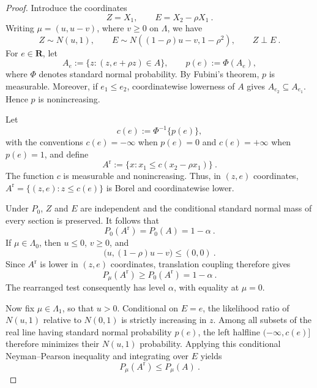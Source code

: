 \documentclass[12pt]{article}
\theoremstyle{remark}
\begin{document}
\begin{proof}
Introduce the coordinates
\[
Z=X_1,
\qquad
E=X_2-\rho X_1~.
\]
Writing $\mu=(u,u-v)$, where $v\ge0$ on $\Lambda$, we have
\[
Z\sim N(u,1),
\qquad
E\sim N((1-\rho)u-v,1-\rho^2),
\qquad
Z\perp E~.
\]
For $e\in\mathbf R$, let
\[
A_e:=\{z:(z,e+\rho z)\in A\},
\qquad
p(e):=\Phi(A_e),
\]
where $\Phi$ denotes standard normal probability.  By Fubini's theorem,
$p$ is measurable.  Moreover, if $e_1\le e_2$, coordinatewise lowerness of
$A$ gives $A_{e_2}\subseteq A_{e_1}$.  Hence $p$ is nonincreasing.

Let
\[
c(e):=\Phi^{-1}\{p(e)\},
\]
with the conventions $c(e)=-\infty$ when $p(e)=0$ and $c(e)=+\infty$ when
$p(e)=1$, and define
\begin{equation}\label{eq:rearranged-set}
A^{\mathrm r}
:=\{x:x_1\le c(x_2-\rho x_1)\}~.
\end{equation}
The function $c$ is measurable and nonincreasing.  Thus, in $(z,e)$
coordinates, $A^{\mathrm r}=\{(z,e):z\le c(e)\}$ is Borel and
coordinatewise lower.

Under $P_0$, $Z$ and $E$ are independent and the conditional standard normal
mass of every section is preserved.  It follows that
\[
P_0(A^{\mathrm r})=P_0(A)=1-\alpha~.
\]
If $\mu\in\Lambda_0$, then $u\le0$, $v\ge0$, and
\[
\bigl(u,(1-\rho)u-v\bigr)\le(0,0)~.
\]
Since $A^{\mathrm r}$ is lower in $(z,e)$ coordinates, translation coupling
therefore gives
\[
P_\mu(A^{\mathrm r})\ge P_0(A^{\mathrm r})=1-\alpha~.
\]
The rearranged test consequently has level $\alpha$, with equality at
$\mu=0$.

Now fix $\mu\in\Lambda_1$, so that $u>0$.  Conditional on $E=e$, the
likelihood ratio of $N(u,1)$ relative to $N(0,1)$ is strictly increasing in
$z$.  Among all subsets of the real line having standard normal probability
$p(e)$, the left halfline $(-\infty,c(e)]$ therefore minimizes their
$N(u,1)$ probability.  Applying this conditional Neyman--Pearson inequality
and integrating over $E$ yields
\begin{equation}\label{eq:weak-rearrangement}
P_\mu(A^{\mathrm r})\le P_\mu(A)~.
\end{equation}


\end{proof}
\end{document}
